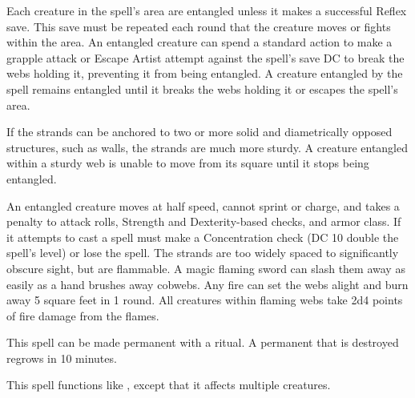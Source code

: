 \spellrng{\rngclose}
\begin{spelleffect}
  Each creature in the spell's area are entangled unless it makes a successful Reflex save. This save must be repeated each round that the creature moves or fights within the area. An entangled creature can spend a standard action to make a grapple attack or Escape Artist attempt against the spell's save DC to break the webs holding it, preventing it from being entangled. A creature entangled by the spell remains entangled until it breaks the webs holding it or escapes the spell's area.
  \par If the strands can be anchored to two or more solid and diametrically opposed structures, such as walls, the strands are much more sturdy. A creature entangled within a sturdy web is unable to move from its square until it stops being entangled.
\end{spelleffect}
\begin{spellnotes}
  An entangled creature moves at half speed, cannot sprint or charge, and takes a  penalty to attack rolls, Strength and Dexterity-based checks, and armor class. If it attempts to cast a spell must make a Concentration check (DC 10 \add double the spell's level) or lose the spell.
  The strands are too widely spaced to significantly obscure sight, but are flammable. A magic flaming sword can slash them away as easily as a hand brushes away cobwebs. Any fire can set the webs alight and burn away 5 square feet in 1 round. All creatures within flaming webs take 2d4 points of fire damage from the flames.
  
  This spell can be made permanent with a  ritual. A permanent  that is destroyed regrows in 10 minutes.
\end{spellnotes}

\begin{spelleffect}
  This spell functions like , except that it affects multiple creatures.
\end{spelleffect}

